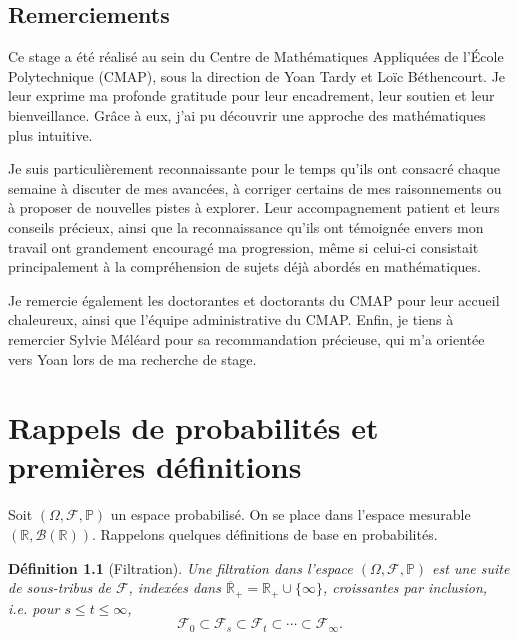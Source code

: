 \documentclass[openany]{book}
\newcommand{\F}{\mathscr{F}}
\newcommand{\carE}{\mathscr{E}}
\renewcommand{\P}{\mathds{P}}
\newcommand{\R}{\mathbb{R}}
\newcommand{\1}{\mathbbm{1}}
\theoremstyle{thmfont}
\theoremstyle{deffont}
\newtheorem{definition}[definition]{Définition}
\theoremstyle{thmfont}
\theoremstyle{deffont}
\begin{document}
{%

\section*{Remerciements}

Ce stage a été réalisé au sein du Centre de Mathématiques Appliquées de l’École Polytechnique (CMAP), sous la direction de Yoan Tardy et Loïc Béthencourt. Je leur exprime ma profonde gratitude pour leur encadrement, leur soutien et leur bienveillance. Grâce à eux, j’ai pu découvrir une approche des mathématiques plus intuitive.

Je suis particulièrement reconnaissante pour le temps qu’ils ont consacré chaque semaine à discuter de mes avancées, à corriger certains de mes raisonnements ou à proposer de nouvelles pistes à explorer. Leur accompagnement patient et leurs conseils précieux, ainsi que la reconnaissance qu’ils ont témoignée envers mon travail ont grandement encouragé ma progression, même si celui-ci consistait principalement à la compréhension de sujets déjà abordés en mathématiques.

Je remercie également les doctorantes et doctorants du CMAP pour leur accueil chaleureux, ainsi que l’équipe administrative du CMAP. Enfin, je tiens à remercier Sylvie Méléard pour sa recommandation précieuse, qui m’a orientée vers Yoan lors de ma recherche de stage.

}
\chapter{Rappels de probabilités et premières définitions}

Soit $(\Omega, \F, \P )$ un espace probabilisé. On se place dans l'espace mesurable $(\R, \mathcal B(\R))$. Rappelons quelques définitions de base en probabilités.

\begin{definition}[Filtration] Une \textit{filtration} dans l'espace $(\Omega, \F, \P )$ est une suite de sous-tribus de $\F$, indexées dans $\overline{\R}_+ = \R_+ \cup \{\infty\}$, croissantes par inclusion, \\
i.e. pour $s \leq t \leq \infty$,
$$\F_0 \subset \F_s \subset \F_t\subset \cdots \subset \F_\infty .$$

\label{def:filtration}
\end{definition}
\end{document}
